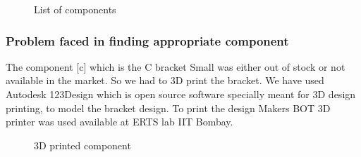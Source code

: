 \documentclass[12pt]{article}
\begin{document}
\begin{figure}[h!]
	\hspace{2cm}
	\caption{List of components}
\end{figure}
\newpage
\subsubsection{Problem faced in finding appropriate component}
The component [c] which is the C bracket Small was either out of stock or not available in
the market. So we had to 3D print the bracket. We have used Autodesk 123Design which
is open source software specially meant for 3D design printing, to model the bracket
design. To print the design Makers BOT 3D printer was used available at ERTS lab IIT
Bombay.
\begin{figure}[h!]
	\centering
	\hspace{2cm}
	\newline
	
	\caption{3D printed component}
\end{figure}
\end{document}

